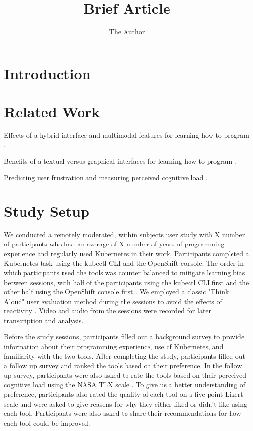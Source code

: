 \documentclass[11pt, oneside]{article}   	%
\title{Brief Article}
\author{The Author}
\begin{document}
\maketitle

\section{Introduction}

\section{Related Work}

Effects of a hybrid interface and multimodal features for learning how to program \cite{unal2021effects, grafsgaard2014additive}.

Benefits of a textual versus graphical interfaces for learning how to program \cite{dillon2012comparing}.

Predicting user frustration and measuring perceived cognitive load \cite{feild2010predicting, hart1988development}. 


\section{Study Setup}
We conducted a remotely moderated, within subjects user study with X number of participants who had an average of X number of years of programming experience and regularly used Kubernetes in their work. Participants completed a Kubernetes task using the kubectl CLI and the OpenShift console. The order in which participants used the tools was counter balanced to mitigate learning bias between sessions, with half of the participants using the kubectl CLI first and the other half using the OpenShift console first \cite{}. We employed a classic "Think Aloud" user evaluation method during the sessions to avoid the effects of reactivity \cite{}. Video and audio from the sessions were recorded for later transcription and analysis.

Before the study sessions, participants filled out a background survey to provide information about their programming experience, use of Kubernetes, and familiarity with the two tools. After completing the study, participants filled out a follow up survey and ranked the tools based on their preference. In the follow up survey, participants were also asked to rate the tools based on their perceived cognitive load using the NASA TLX scale \cite{}. To give us a better understanding of preference, participants also rated the quality of each tool on a five-point Likert scale and were asked to give reasons for why they either liked or didn’t like using each tool. Participants were also asked to share their recommendations for how each tool could be improved.
\end{document}
